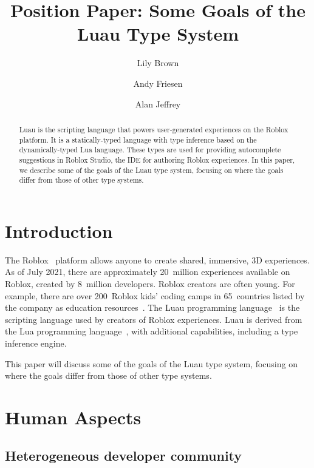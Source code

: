 \documentclass[acmsmall]{acmart}
\begin{document}
\title{Position Paper: Some Goals of the Luau Type System}

\author{Lily Brown}
\author{Andy Friesen}
\author{Alan Jeffrey}

\begin{abstract}
  Luau is the scripting language that powers user-generated experiences on the
  Roblox platform. It is a statically-typed language with type inference based
  on the dynamically-typed Lua language. These types are used for providing
  autocomplete suggestions in Roblox Studio, the IDE for authoring Roblox experiences.
  In this paper, we describe some of the goals of the Luau type system,
  focusing on where the goals differ from those of other type systems.
\end{abstract}

\maketitle

\section{Introduction}

The Roblox~\cite{Roblox} platform allows anyone to create shared,
immersive, 3D experiences.  As of July 2021, there are
approximately 20~million experiences available on Roblox, created
by 8~million developers.  Roblox creators are often young. For
example, there are over 200~Roblox kids' coding camps in 65~countries
listed by the company as education resources~\cite{AllEducators}.
The Luau programming language~\cite{Luau} is the scripting language
used by creators of Roblox experiences. Luau is derived from the Lua
programming language~\cite{Lua}, with additional capabilities,
including a type inference engine.

This paper will discuss some of the goals of the Luau type system,
focusing on where the goals differ from those of other type systems.

\section{Human Aspects}
\subsection{Heterogeneous developer community}
\end{document}

